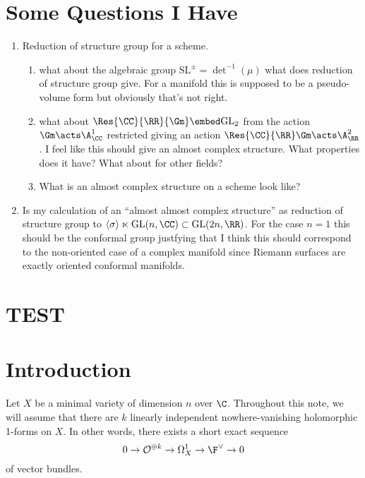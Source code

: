 \documentclass[12pt]{article}
\begin{document}
\section{Some Questions I Have}

\begin{enumerate}
\item Reduction of structure group for a scheme.
\begin{enumerate}
\item what about the algebraic group $\mathrm{SL}^{\pm} = \det^{-1}(\mu)$ what does reduction of structure group give. For a manifold this is supposed to be a pseudo-volume form but obviously that's not right.
\item what about $\Res{\CC}{\RR}{\Gm} \embed \mathrm{GL}_2$ from the action $\Gm \acts \A^1_{\CC}$ restricted giving an action $\Res{\CC}{\RR} \Gm \acts \A^2_{\RR}$. I feel like this should give an almost complex structure. What properties does it have? What about for other fields?
\item What is an almost complex structure on a scheme look like?
\end{enumerate}
\item Is my calculation of an ``almost almost complex structure'' as reduction of structure group to $\left< \sigma \right> \ltimes \mathrm{GL}(n, \CC) \subset \mathrm{GL}(2n, \RR)$. For the case $n = 1$ this should be the conformal group justfying that I think this should correspond to the non-oriented case of a complex manifold since Riemann surfaces are exactly oriented conformal manifolds.
\end{enumerate}


\section{TEST}



\section{Introduction}

\newcommand{\cO}{\mathcal{O}}
\newcommand{\cN}{\mathcal{N}}

Let $X$ be a minimal variety of dimension $n$ over $\C$. Throughout this note, we will assume that there are $k$ linearly independent nowhere-vanishing holomorphic 1-forms on $X$. In other words, there exists a short exact sequence
\[ 0 \rightarrow \cO^{\oplus k} \rightarrow \Omega_{X}^{1} \rightarrow \F^{\vee} \rightarrow 0 \]
of vector bundles.
\end{document}
